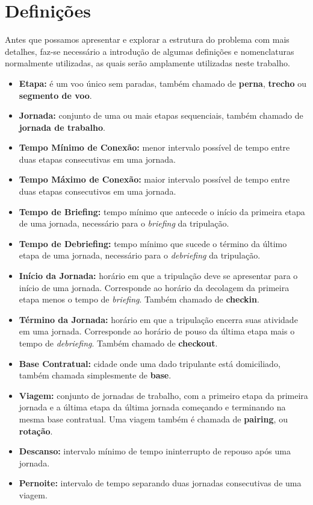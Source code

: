 
\section{Definições}
\label{sec:definicoes}

Antes que possamos apresentar e explorar a estrutura do problema com mais detalhes, faz-se
necessário a introdução de algumas definições e nomenclaturas normalmente utilizadas, as quais serão
amplamente utilizadas neste trabalho.

\begin{itemize}
	\item {\bf Etapa:} é um voo único sem paradas, também chamado de {\bf perna}, {\bf trecho} ou 
	{\bf segmento de voo}.
	\item {\bf Jornada:} conjunto de uma ou mais etapas sequenciais, também chamado de {\bf jornada 
	de trabalho}. 
	\item {\bf Tempo Mínimo de Conexão:} menor intervalo possível de tempo entre duas etapas 
	consecutivas em uma jornada.
	\item {\bf Tempo Máximo de Conexão:} maior intervalo possível de tempo entre duas etapas 
	consecutivos em uma jornada.
	\item {\bf Tempo de Briefing:} tempo mínimo que antecede o início da primeira etapa de uma
	jornada, necessário para o {\it briefing} da tripulação.
	\item {\bf Tempo de Debriefing:} tempo mínimo que sucede o término da último etapa de uma
	jornada,
	necessário para o {\it debriefing} da tripulação.
	\item {\bf Início da Jornada:} horário em que a tripulação deve se apresentar para o início de
	uma jornada. Corresponde ao horário da decolagem da primeira etapa menos o tempo de 
	{\it briefing}. 
	Também chamado de {\bf checkin}.
	\item {\bf Término da Jornada:} horário em que a tripulação encerra suas atividade em uma 
	jornada. Corresponde ao horário de pouso da última etapa mais o tempo de {\it debriefing}.
	Também chamado de {\bf checkout}.
	\item {\bf Base Contratual:} cidade onde uma dado tripulante está domiciliado, também chamada 
	simplesmente de {\bf base}.
	\item {\bf Viagem:} conjunto de jornadas de trabalho, com a primeiro etapa da primeira jornada e
	a última etapa da última jornada começando e terminando na mesma base contratual. 
	Uma viagem também é chamada de {\bf pairing}, ou {\bf rotação}.
	\item {\bf Descanso:} intervalo mínimo de tempo ininterrupto de repouso após uma jornada.
	\item {\bf Pernoite:} intervalo de tempo separando duas jornadas consecutivas de uma viagem.
\end{itemize}

